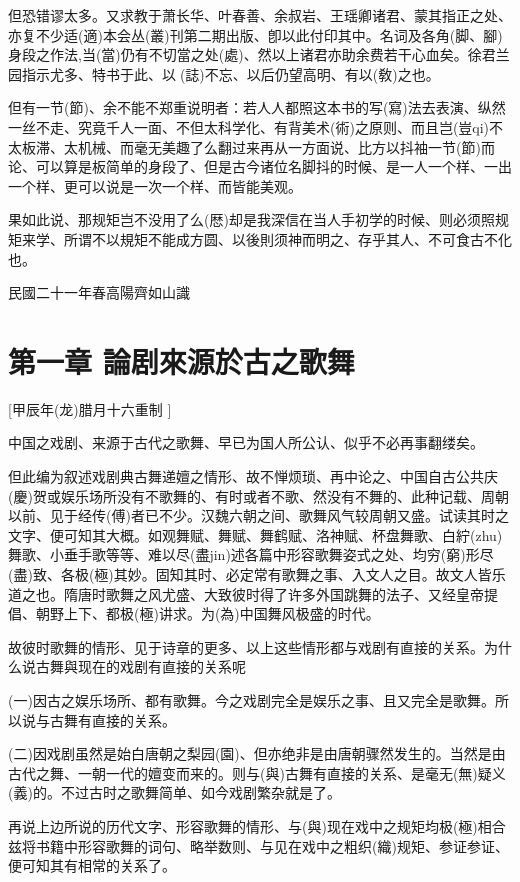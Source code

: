 \documentclass{zhvt-classic}
\begin{document}
但恐错谬太多。又求教于萧长华、叶春善、余叔岩、王瑶卿诸君、蒙其指正之处、亦复不少适(適)本会丛(叢)刊第二期出版、卽以此付印其中。名词及各角(脚、腳)身段之作法,当(當)仍有不切當之处(處)、然以上诸君亦助余费若干心血矣。徐君兰园指示尤多、特书于此、以𰵧(誌)不忘、以后仍望高明、有以(敎)之也。

但有一节(節)、余不能不郑重说明者：若人人都照这本书的写(寫)法去表演、纵然一丝不走、究竟千人一面、不但太科学化、有背美术(術)之原则、而且岂(豈qi)不太板滞、太机械、而毫无美趣了么翻过来再从一方面说、比方以抖袖一节(節)而论、可以算是板简单的身段了、但是古今诸位名脚抖的时候、是一人一个样、一出一个样、更可以说是一次一个样、而皆能美观。

果如此说、那规矩岂不没用了么(厯)却是我深信在当人手初学的时候、则必须照规矩来学、所谓不以規矩不能成方圆、以後則须神而明之、存乎其人、不可食古不化也。

民國二十一年春高陽齊如山識

\chapter*[]{第一章 論剧來源於古之歌舞}[甲辰年(龙)腊月十六重制
]
\begin{preface}
中国之戏剧、来源于古代之歌舞、早已为国人所公认、似乎不必再事翻缕矣。
\end{preface}

但此编为叙述戏剧典古舞递嬗之情形、故不惮烦琐、再中论之、中国自古公共庆(慶)贺或娱乐场所没有不歌舞的、有时或者不歌、然没有不舞的、此种记载、周朝以前、见于经传(傅)者已不少。汉魏六朝之间、歌舞风气较周朝又盛。试读其时之文字、便可知其大概。如观舞赋、舞赋、舞鹤赋、洛神赋、杯盘舞歌、白紵(zhu)舞歌、小垂手歌等等、难以尽(盡jin)述各篇中形容歌舞姿式之处、均穷(窮)形尽(盡)致、各极(極)其妙。固知其时、必定常有歌舞之事、入文人之目。故文人皆乐道之也。隋唐时歌舞之风尤盛、大致彼时得了许多外国跳舞的法子、又经皇帝提倡、朝野上下、都极(極)讲求。为(為)中国舞风极盛的时代。

故彼时歌舞的情形、见于诗章的更多、以上这些情形都与戏剧有直接的关系。为什么说古舞與现在的戏剧有直接的关系呢

(一)因古之娱乐场所、都有歌舞。今之戏剧完全是娱乐之事、且又完全是歌舞。所以说与古舞有直接的关系。

(二)因戏剧虽然是始白唐朝之梨园(園)、但亦绝非是由唐朝骤然发生的。当然是由古代之舞、一朝一代的嬗变而来的。则与(與)古舞有直接的关系、是毫无(無)疑义(義)的。不过古时之歌舞简单、如今戏剧繁杂就是了。

再说上边所说的历代文字、形容歌舞的情形、与(與)现在戏中之规矩均极(極)相合兹将书籍中形容歌舞的词句、略举数则、与见在戏中之粗织(織)规矩、参证参证、便可知其有相常的关系了。
\end{document}
